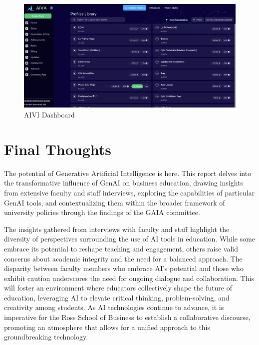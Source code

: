 \documentclass[
]{book}
\begin{document}
\begin{figure}

{\centering \includegraphics[width=0.95\linewidth]{AIVI_Dashboard} 

}

\caption{AIVI Dashboard}\label{fig:unnamed-chunk-17}
\end{figure}

\hypertarget{final-thoughts}{%
\chapter{Final Thoughts}\label{final-thoughts}}

The potential of Generative Artificial Intelligence is here. This report delves into the transformative influence of GenAI on business education, drawing insights from extensive faculty and staff interviews, exploring the capabilities of particular GenAI tools, and contextualizing them within the broader framework of university policies through the findings of the GAIA committee.

The insights gathered from interviews with faculty and staff highlight the diversity of perspectives surrounding the use of AI tools in education. While some embrace its potential to reshape teaching and engagement, others raise valid concerns about academic integrity and the need for a balanced approach. The disparity between faculty members who embrace AI's potential and those who exhibit caution underscores the need for ongoing dialogue and collaboration. This will foster an environment where educators collectively shape the future of education, leveraging AI to elevate critical thinking, problem-solving, and creativity among students. As AI technologies continue to advance, it is imperative for the Ross School of Business to establish a collaborative discourse, promoting an atmosphere that allows for a unified approach to this groundbreaking technology.
\end{document}
